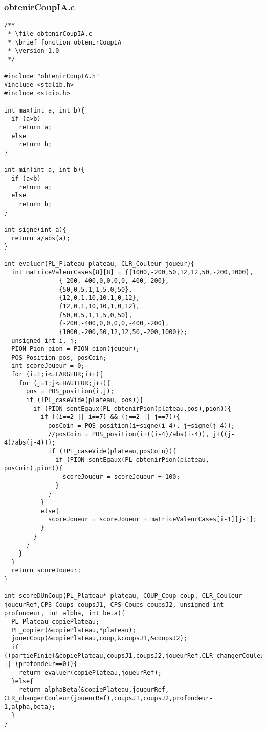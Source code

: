 \subsubsection{obtenirCoupIA.c}
\begin{lstlisting}
/**
 * \file obtenirCoupIA.c
 * \brief fonction obtenirCoupIA
 * \version 1.0
 */

#include "obtenirCoupIA.h"
#include <stdlib.h>
#include <stdio.h>

int max(int a, int b){
  if (a>b)
    return a;
  else
    return b;
}

int min(int a, int b){
  if (a<b)
    return a;
  else
    return b;
}

int signe(int a){
  return a/abs(a);
}

int evaluer(PL_Plateau plateau, CLR_Couleur joueur){
  int matriceValeurCases[8][8] = {{1000,-200,50,12,12,50,-200,1000},
			   {-200,-400,0,0,0,0,-400,-200},
			   {50,0,5,1,1,5,0,50},
			   {12,0,1,10,10,1,0,12},
			   {12,0,1,10,10,1,0,12},
			   {50,0,5,1,1,5,0,50},
			   {-200,-400,0,0,0,0,-400,-200},
			   {1000,-200,50,12,12,50,-200,1000}};
  unsigned int i, j;
  PION_Pion pion = PION_pion(joueur);
  POS_Position pos, posCoin;
  int scoreJoueur = 0;
  for (i=1;i<=LARGEUR;i++){
    for (j=1;j<=HAUTEUR;j++){
      pos = POS_position(i,j);
      if (!PL_caseVide(plateau, pos)){
        if (PION_sontEgaux(PL_obtenirPion(plateau,pos),pion)){
          if ((i==2 || i==7) && (j==2 || j==7)){
            posCoin = POS_position(i+signe(i-4), j+signe(j-4));
            //posCoin = POS_position(i+((i-4)/abs(i-4)), j+((j-4)/abs(j-4)));
            if (!PL_caseVide(plateau,posCoin)){
              if (PION_sontEgaux(PL_obtenirPion(plateau, posCoin),pion)){
                scoreJoueur = scoreJoueur + 100;
              }
            }
          }
          else{
            scoreJoueur = scoreJoueur + matriceValeurCases[i-1][j-1];
          }
        }
      }      
    }
  }
  return scoreJoueur;
}

int scoreDUnCoup(PL_Plateau* plateau, COUP_Coup coup, CLR_Couleur joueurRef,CPS_Coups coupsJ1, CPS_Coups coupsJ2, unsigned int profondeur, int alpha, int beta){
  PL_Plateau copiePlateau;
  PL_copier(&copiePlateau,*plateau);
  jouerCoup(&copiePlateau,coup,&coupsJ1,&coupsJ2);
  if ((partieFinie(&copiePlateau,coupsJ1,coupsJ2,joueurRef,CLR_changerCouleur(joueurRef)).partieFinie) || (profondeur==0)){
    return evaluer(copiePlateau,joueurRef);
  }else{
    return alphaBeta(&copiePlateau,joueurRef, CLR_changerCouleur(joueurRef),coupsJ1,coupsJ2,profondeur-1,alpha,beta);
  }
}


\end{lstlisting}
